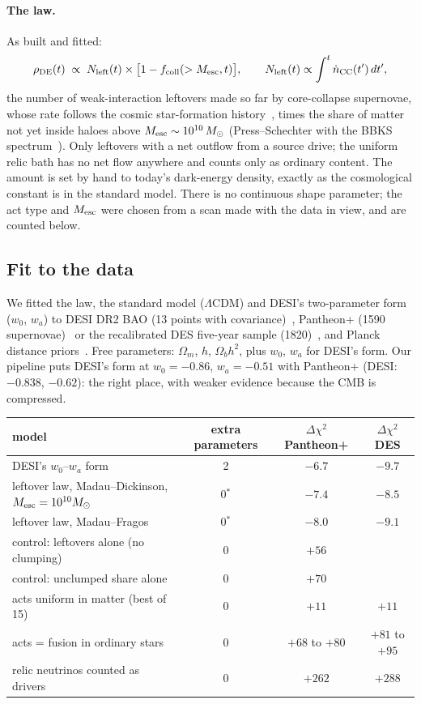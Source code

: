 \documentclass[11pt,a4paper]{article}
\begin{document}
\paragraph{The law.} As built and fitted:
\begin{equation}\label{eq:law}
\rho_{\rm DE}(t)\;\propto\;N_{\rm left}(t)\times\bigl[1-f_{\rm coll}(>M_{\rm esc},t)\bigr],\qquad
N_{\rm left}(t)\propto\int^t \dot n_{\rm CC}(t')\,dt',
\end{equation}
the number of weak-interaction leftovers made so far by core-collapse supernovae, whose rate follows the cosmic star-formation
history~\cite{madau,madaufragos}, times the share of matter not yet inside haloes above $M_{\rm esc}\sim10^{10}\,M_\odot$ (Press--Schechter with
the BBKS spectrum~\cite{ps,bbks}). Only leftovers with a net outflow from a source drive; the uniform relic bath has no net flow anywhere and
counts only as ordinary content. The amount is set by hand to today's dark-energy density, exactly as the cosmological constant is in the
standard model. There is no continuous shape parameter; the act type and $M_{\rm esc}$ were chosen from a scan made with the data in
view, and are counted below.

\subsection{Fit to the data}
We fitted the law, the standard model ($\Lambda$CDM) and DESI's two-parameter form ($w_0$, $w_a$) to DESI DR2 BAO (13 points with covariance)~\cite{desi},
Pantheon+ (1590 supernovae)~\cite{pantheon} or the recalibrated DES five-year sample (1820)~\cite{desy5}, and Planck distance priors~\cite{chw}.
Free parameters: $\Omega_m$, $h$, $\Omega_bh^2$, plus $w_0$, $w_a$ for DESI's form. Our pipeline puts DESI's form at $w_0=-0.86$, $w_a=-0.51$
with Pantheon+ (DESI: $-0.838$, $-0.62$): the right place, with weaker evidence because the CMB is compressed.

\begin{center}\small
\begin{tabular}{@{}lccc@{}}
\toprule
model & extra parameters & $\Delta\chi^2$ Pantheon+ & $\Delta\chi^2$ DES \\
\midrule
DESI's $w_0$--$w_a$ form & 2 & $-6.7$ & $-9.7$ \\
leftover law, Madau--Dickinson, $M_{\rm esc}=10^{10}M_\odot$ & 0$^\ast$ & $-7.4$ & $-8.5$ \\
leftover law, Madau--Fragos & 0$^\ast$ & $-8.0$ & $-9.1$ \\
control: leftovers alone (no clumping) & 0 & $+56$ & \\
control: unclumped share alone & 0 & $+70$ & \\
acts uniform in matter (best of 15) & 0 & $+11$ & $+11$ \\
acts = fusion in ordinary stars & 0 & $+68$ to $+80$ & $+81$ to $+95$ \\
relic neutrinos counted as drivers & 0 & $+262$ & $+288$ \\
\bottomrule
\end{tabular}
\end{center}
\end{document}

